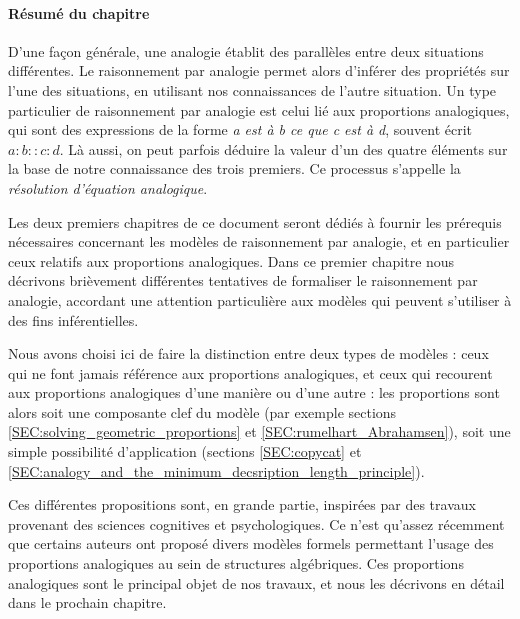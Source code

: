 \paragraph{Résumé du chapitre}

D'une façon générale, une analogie établit des parallèles entre deux situations
différentes. Le raisonnement par analogie permet alors d'inférer des propriétés
sur l'une des situations, en utilisant nos connaissances de l'autre situation.
Un type particulier de raisonnement par analogie est celui lié aux proportions
analogiques, qui sont des expressions de la forme \textit{a est à b ce que c
est à d}, souvent écrit $a:b::c:d$. Là aussi, on peut parfois déduire la valeur
d'un des quatre éléments sur la base de notre connaissance des trois premiers.
Ce processus s'appelle la \textit{résolution d'équation analogique}.

Les deux premiers chapitres de ce document seront dédiés à fournir les
prérequis nécessaires concernant les modèles de raisonnement par analogie, et
en particulier ceux relatifs aux proportions analogiques. Dans ce premier
chapitre nous décrivons brièvement différentes tentatives de formaliser le
raisonnement par analogie, accordant une attention particulière aux modèles qui
peuvent s'utiliser à des fins inférentielles.

Nous avons choisi ici de faire la distinction entre deux types de modèles :
ceux qui ne font jamais référence aux proportions analogiques, et ceux qui
recourent aux proportions analogiques d'une manière ou d'une autre : les
proportions sont alors soit une composante clef du modèle (par exemple sections
\ref{SEC:solving_geometric_proportions} et \ref{SEC:rumelhart_Abrahamsen}),
soit une simple possibilité d'application (sections \ref{SEC:copycat} et
\ref{SEC:analogy_and_the_minimum_decsription_length_principle}).

Ces différentes propositions sont, en grande partie, inspirées par des travaux
provenant des sciences cognitives et psychologiques. Ce n'est qu'assez
récemment que certains auteurs \cite{FedPirYvo95, LepShi96} ont proposé divers
modèles formels permettant l'usage des proportions analogiques au sein de
structures algébriques. Ces proportions analogiques sont le principal objet de
nos travaux, et nous les décrivons en détail dans le prochain chapitre.
